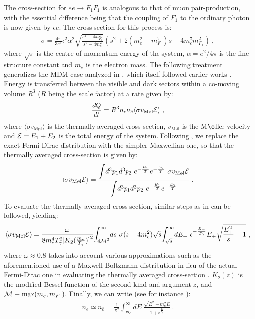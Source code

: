 \documentclass[12pt]{article}
\begin{document}
The cross-section for $e \overline{e} \rightarrow F_1 \overline{F}_1$ is analogous to that of muon pair-production, with the essential difference being that the coupling of $F_1$ to the ordinary photon is now given by $\epsilon e$. The cross-section for this process is:
%
\begin{eqnarray}
\sigma = \frac{4\pi}{3s^3} \epsilon ^2 \alpha ^2 \sqrt{\frac{s^2 - 4 m _{F_1} ^2}{s^2 - 4 m _{e} ^2}} \left (s^2 + 2 \left (m _{e} ^2 + m _{F_1} ^2 \right )s + 4m _{e} ^2 m _{F_1} ^2 \right ) \ ,
\end{eqnarray}
%
where $\sqrt{s}$ is the centre-of-momentum energy of the system, $\alpha = e^2/4\pi$ is the fine-structure constant and $m _{e}$ is the electron mass. The following treatment generalizes the MDM case analyzed in \cite{predictions}, which itself followed earlier works \cite{updated,carlson,ciarcellutiliege}. Energy is transferred between the visible and dark sectors within a co-moving volume $R^3$ ($R$ being the scale factor) at a rate given by:
%
\begin{eqnarray}
\frac{dQ}{dt} = R^3 n _{e} n _{\overline{e}} \langle \sigma v_{\text{M\o l}} {\cal E} \rangle \ ,
\label{dqdt}
\end{eqnarray}
%
where $\langle \sigma v_{\text{M\o l}} \rangle$ is the thermally averaged cross-section, $ v_{\text{M\o l}}$ is the M$\o$ller velocity and ${\cal E} = E_1 + E_2$ is the total energy of the system. Following \cite{ciarcellutiliege,gondologelmini}, we replace the exact Fermi-Dirac distribution with the simpler Maxwellian one, so that the thermally averaged cross-section is given by:
%
\begin{eqnarray}
\langle \sigma v_{\text{M\o l}} {\cal E} \rangle = \frac{\mathlarger \int d^3p_1 d^3p_2 \ e^{-\frac{E_1}{T}} e^{-\frac{E_2}{T}} \ \sigma v_{\text{M\o l}}{\cal E}}{\mathlarger \int d^3p_1 d^3p_2 \ e^{-\frac{E_1}{T}}e^{-\frac{E_2}{T}}} \ .
\end{eqnarray}
%
To evaluate the thermally averaged cross-section, similar steps as in \cite{ciarcellutiliege,gondologelmini} can be followed, yielding:
%
\begin{eqnarray}
\langle \sigma v_{\text{M\o l}}{\cal E} \rangle = 
\frac{\omega}{8m_e^4 T_{\gamma}^2 {[K_2(\frac{m_e}{T_{\gamma}})]}^2}
\mathlarger \int _{4{\cal M}^2}^{\infty} ds \ \sigma (s - 4m_e^2)
\sqrt{s} \mathlarger \int _{\sqrt{s}}^{\infty} dE_+ \ e^{-\frac{E_+}{T _{\gamma}}} E_+ \sqrt{\frac{E _+ ^2}{s} - 1} \ ,
\label{sig}
\end{eqnarray}
%
where $\omega \approx 0.8$ takes into account various approximations such as the aforementioned use of a Maxwell-Boltzmann distribution in lieu of the actual Fermi-Dirac one in evaluating the thermally averaged cross-section \cite{ciarcellutiliege}. $K_2(z)$ is the modified Bessel function of the second kind and argument $z$, and ${\cal M} \equiv \max(m _e, m _{F_1})$. Finally, we can write (see for instance \cite{earlyuniverse}):
%
\begin{eqnarray}
n _{e} \simeq n _{\overline{e}} = \frac{1}{\pi ^2} \int _{m_e} ^{\infty} dE \ \frac{\sqrt{E^2 - m _e ^2}E}{1 + e^{\frac{E}{T _{\gamma}}}} \ .
\end{eqnarray}
%
\end{document}
